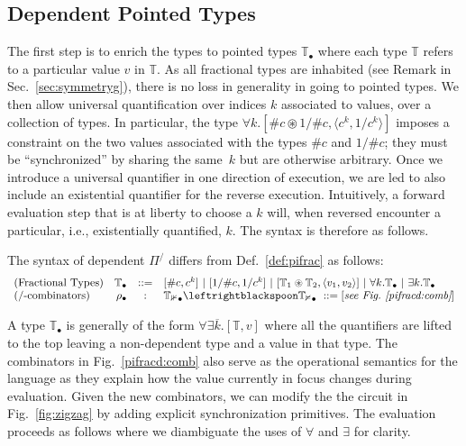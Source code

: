 \documentclass[a4paper,USenglish]{lipics-v2016-utf8x}
\newcommand{\hash}{\#}
\newcommand{\alt}{~|~}
\newcommand{\order}[1]{\hash #1}
\newcommand{\iorder}[1]{1/\hash #1}
\begin{document}
\subsection{Dependent Pointed Types}\label{sec:deppointedtypes}

The first step is to enrich the types to pointed types $\mathbb{T_\bullet}$
where each type $\mathbb{T}$ refers to a particular value $v$ in
$\mathbb{T}$. As all fractional types are inhabited (see Remark
in Sec.~\ref{sec:symmetryg}), there is no loss in generality in going
to pointed types. We then allow universal quantification over indices $k$
associated to values, over a collection of types.  In particular, the type
$\forall k.[\order{c} \circledast \iorder{c}, \langle c^k, 1/c^k \rangle]$
imposes a constraint on the two values associated with the types $\order{c}$ and
$\iorder{c}$; they must be ``synchronized'' by sharing the same~$k$ but are
otherwise arbitrary. Once we introduce a universal quantifier in one direction
of execution, we are led to also include an existential quantifier for the
reverse execution. Intuitively, a forward evaluation step that is at liberty to
choose a $k$ will, when reversed encounter a particular, i.e., existentially
quantified, $k$. The syntax is therefore as follows.

\begin{definition}[Dependent $\Pi^/$]
\label{def:pifracd}
The syntax of dependent $\Pi^/$ differs from Def.~\ref{def:pifrac} as follows:
\[\begin{array}{lrcl}
(\textrm{Fractional Types}) & \mathbb{T_\bullet} &::=&
  [\order{c},c^k] \alt
  [\iorder{c},1/c^k] \alt
  [\mathbb{T}_1 \circledast \mathbb{T}_2,\langle v_1,v_2 \rangle] \alt
  \forall k.\mathbb{T_\bullet} \alt \exists k.\mathbb{T_\bullet} \\
 (\textrm{/-combinators}) & \rho_\bullet &:&
  \mathbb{T_1}_{\bullet} \leftrightblackspoon \mathbb{T_2}_{\bullet} ~::=
  [\textit{see Fig.~\ref{pifracd:comb}}]
\end{array}\]
\end{definition}

A type $\mathbb{T}_\bullet$ is generally of the form
$\forall\exists{\overline{k}}.[\mathbb{T},v]$ where all the quantifiers are
lifted to the top leaving a non-dependent type and a value in that type. The
combinators in Fig.~\ref{pifracd:comb} also serve as the operational semantics
for the language as they explain how the value currently in focus changes during
evaluation. Given the new combinators, we can modify the the circuit in
Fig.~\ref{fig:zigzag} by adding explicit synchronization primitives. The
evaluation proceeds as follows where we diambiguate the uses of $\forall$ and
$\exists$ for clarity.
\end{document}

